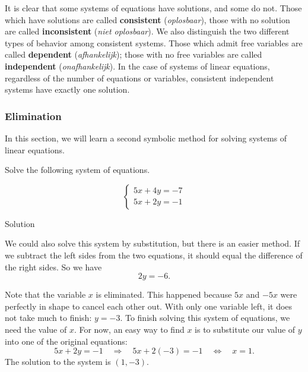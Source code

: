 It is clear that some systems of equations have solutions, and some do not. Those which have solutions are called   \textbf{consistent} (\textit{oplosbaar}), those with no solution are called   \textbf{inconsistent} (\textit{niet oplosbaar}). We also distinguish the two different types of behavior among consistent systems. Those which admit free variables are called   \textbf{dependent} (\textit{afhankelijk});  those with no free variables are called   \textbf{independent} (\textit{onafhankelijk}). In the case of systems of linear equations, regardless of the number of equations or variables, consistent independent systems have exactly one solution.  



\subsubsection{Elimination}\label{syst_lin_eq_elimination}
In this section, we will learn a second symbolic method for solving systems of linear equations.


\begin{example}\label{syst_lin_eq_elimination_ex1}
Solve the following system of equations.

\[ \left\{ \begin{array}{l} 5x+4y=-7 \\ 5x+2y=-1  \end{array} \right.  \]


Solution 

We could also solve this system by substitution, but there is an easier method. If
we subtract the left sides from the two equations, it should equal the difference of the right sides. So we have
\[ 2y=-6.  \]

Note that the variable $x$ is eliminated. This happened because $5x$ and $-5x$ were perfectly in shape to cancel each other out. With only one variable left, it does not take much to finish: $y=-3$. To finish solving this system of equations, we need the value of $x$. For now, an easy way to find $x$ is to substitute our value of $y$ into one of the original equations:
\[ 5x + 2y = -1 \quad \Rightarrow  \quad 5x + 2(-3) = -1  \quad \Leftrightarrow  \quad x = 1. \]
The solution to the system is $(1,-3)$.

\end{example}



